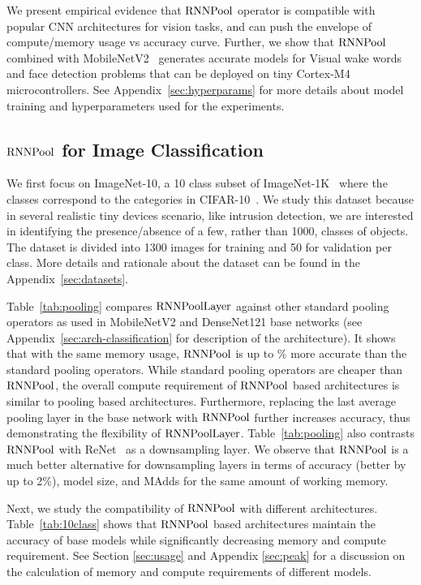 \documentclass[10pt]{article}
\newcommand{\rpool}{\ensuremath{{\rm RNNPool}}\xspace}
\newcommand{\rpoollayer}{\ensuremath{{\rm RNNPoolLayer}}\xspace}
\newcommand{\alg}{\rpool}
\begin{document}
We present empirical evidence that \rpool operator is compatible with
popular CNN architectures for vision tasks, and can push the envelope
of compute/memory usage vs accuracy curve. Further, we show
that \rpool combined with MobileNetV2~\citep{sandler2018mobilenetv2}
generates accurate models for Visual wake words and face detection
problems that can be deployed on tiny Cortex-M4 microcontrollers. See
Appendix~\ref{sec:hyperparams} for more details about model training
and hyperparameters used for the experiments.

\subsection{\alg for Image Classification}\label{sec:exp_class}

We first focus on ImageNet-10, a 10 class subset of
ImageNet-1K~\citep{deng2009imagenet} where the classes correspond to
the categories in CIFAR-10~\citep{krizhevsky2009learning}.  We study
this dataset because in several realistic tiny devices scenario, like
intrusion detection, we are interested in identifying the presence/absence
of a few, rather than 1000, classes of objects. The dataset is divided
into 1300 images for training and 50 for validation per class.  More
details and rationale about the dataset can be found in the
Appendix~\ref{sec:datasets}.


Table~\ref{tab:pooling} compares \rpoollayer against other standard
pooling operators as used in MobileNetV2 and DenseNet121 base networks
(see Appendix~\ref{sec:arch-classification} for description of the
architecture).  It shows that with the same memory usage, \rpool is up
to \% more accurate than the standard pooling operators. While
standard pooling operators are cheaper than \rpool, the overall
compute requirement of \rpool based architectures is similar to
pooling based architectures. Furthermore, replacing the last average
pooling layer in the base network with \rpool further increases
accuracy, thus demonstrating the flexibility
of \rpoollayer. Table~\ref{tab:pooling} also contrasts \rpool with
ReNet~\citep{visin2015renet} as a downsampling layer. We observe
that \rpool is a much better alternative for downsampling layers in
terms of accuracy (better by up to 2\%), model size, and MAdds for the
same amount of working memory.


Next, we study the compatibility of \rpool with different
architectures. Table~\ref{tab:10class} shows that \rpool based
architectures maintain the accuracy of base models while significantly
decreasing memory and compute requirement. See Section \ref{sec:usage}
and Appendix \ref{sec:peak} for a discussion on the calculation of
memory and compute requirements of different models.
\end{document}
